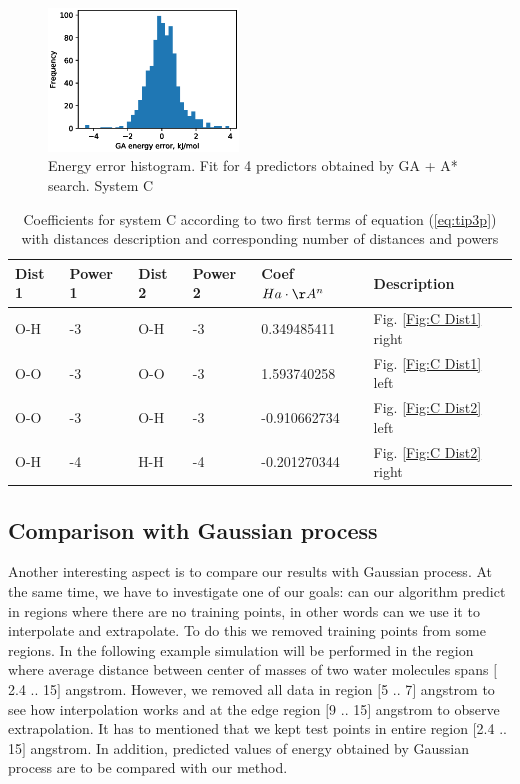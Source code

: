 \documentclass[aps,prl,reprint,amsmath,amssymb,nature]{revtex4-1}
\begin{document}
\begin{figure}
\includegraphics[width=0.45\textwidth]{media/C_GA_energy_error_histogram_4_predictors.eps}
\caption{Energy error histogram. Fit for 4 predictors obtained by GA + A* search. System C}\label{Fig:C_histogram_4_predictors}
\end{figure}

\begin{table}[h]
\caption{Coefficients for system C according to two first terms of equation (\ref{eq:tip3p}) with distances description and corresponding number of distances and powers}
\label{Tab:C coefficients}
\begin{tabular}{|l|l|l|l|l|l|}
\hline
\textbf{Dist 1} & \textbf{Power 1} & \textbf{Dist 2} & \textbf{
Power 2} & \textbf{Coef $Ha\cdot\AA^n$} & \textbf{Description} \\
\hline
O-H & -3 & O-H & -3 & 0.349485411 & Fig. \ref{Fig:C Dist1} right \\
\hline
O-O & -3 & O-O & -3 & 1.593740258 & Fig. \ref{Fig:C Dist1} left \\
\hline
O-O & -3 & O-H & -3 & -0.910662734 & Fig. \ref{Fig:C Dist2} left \\
\hline
O-H & -4 & H-H & -4 & -0.201270344 & Fig. \ref{Fig:C Dist2} right \\
\hline
\end{tabular}
\end{table}


\subsection{Comparison with Gaussian process}

Another interesting aspect is to compare our results with Gaussian 
process. At the same time, we have to investigate one of our goals: can 
our algorithm predict in regions where there are no training points, in 
other words can we use it to interpolate and extrapolate. To do this we 
removed training points from some regions. In the following example 
simulation will be performed in the region where average distance 
between center of masses of two water molecules spans $[$2.4 .. 15$]$ 
angstrom. However, we removed all data in region $[$5 .. 7$]$ angstrom 
to see how interpolation works and at the edge region $[$9 .. 15$]$ 
angstrom to observe extrapolation. It has to mentioned that we kept test 
points in entire region $[$2.4 .. 15$]$ angstrom. In addition, predicted 
values of energy obtained by Gaussian process are to be compared with 
our method. 
\end{document}

